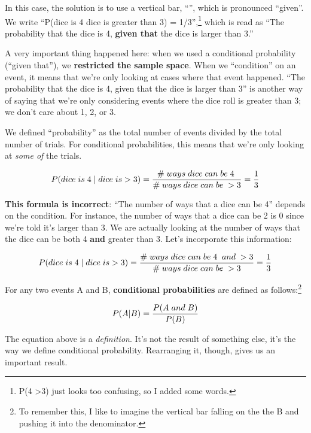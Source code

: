\documentclass[
  letterpaper,
  DIV=11,
  numbers=noendperiod,
  oneside]{scrreprt}
\begin{document}
In this case, the solution is to use a vertical bar, ``\textbar{}'',
which is pronounced ``given''. We write ``P(dice is 4 \textbar{} dice is
greater than 3) = 1/3'',\footnote{P(4 \textbar{} \textgreater3) just
  looks too confusing, so I added some words.} which is read as ``The
probability that the dice is 4, \textbf{given that} the dice is larger
than 3.''

A very important thing happened here: when we used a conditional
probability (``given that''), we \textbf{restricted the sample space}.
When we ``condition'' on an event, it means that we're only looking at
cases where that event happened. ``The probability that the dice is 4,
given that the dice is larger than 3'' is another way of saying that
we're only considering events where the dice roll is greater than 3; we
don't care about 1, 2, or 3.

We defined ``probability'' as the total number of events divided by the
total number of trials. For conditional probabilities, this means that
we're only looking at \emph{some of} the trials.

\begin{align*}
\small P(dice\; is\; 4\; |\; dice\; is >3) = \frac{\#\; ways\;dice\;can\;be\;4\;}{\#\;ways\;dice\;can\;be\;>3}=\frac{1}{3}
\end{align*}

\textbf{This formula is incorrect}: ``The number of ways that a dice can
be 4'' depends on the condition. For instance, the number of ways that a
dice can be 2 is 0 since we're told it's larger than 3. We are actually
looking at the number of ways that the dice can be both 4 \textbf{and}
greater than 3. Let's incorporate this information:

\begin{align*}
\small P(dice\; is\; 4\; |\; dice\; is >3) = \frac{\#\; ways\;dice\;can\;be\;4\;\;and\;>3}{\#\;ways\;dice\;can\;be\;>3}=\frac{1}{3}
\end{align*}

For any two events A and B, \textbf{conditional probabilities} are
defined as follows:\footnote{To remember this, I like to imagine the
  vertical bar falling on the the B and pushing it into the denominator.}

\begin{align*}
\small P(A | B) = \frac{P(A\;and\; B)}{P(B)}
\end{align*}

The equation above is a \emph{definition}. It's not the result of
something else, it's the way we define conditional probability.
Rearranging it, though, gives us an important result.
\end{document}
